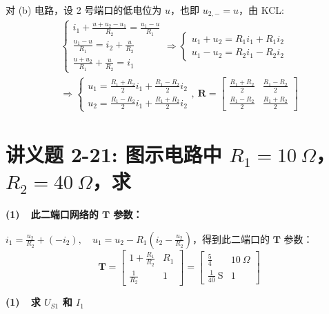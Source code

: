 \documentclass[UTF8]{report}
\theoremstyle{MyLineTheoremStyle} %
\theoremstyle{MyBlockTheoremStyle} %
\theoremstyle{MySubsubsectionStyle} %
\begin{document}
对 (b) 电路，设 2 号端口的低电位为 $u$，也即 $u_{2,-} = u$，由 KCL: 
\begin{gather}
\begin{cases}
    i_1 + \frac{u+u_2 - u_1}{R_2} = \frac{u_1 - u}{R_1} \\ 
    \frac{u_1 - u}{R_1} = i_2 + \frac{u}{R_2} \\ 
    \frac{u+u_2}{R_1} + \frac{u}{R_2} = i_1
\end{cases}
\Longrightarrow
\begin{cases}
    u_1 + u_2 = R_1i_1 + R_1i_2 \\ 
    u_1 - u_2 = R_2i_1 - R_2i_2
\end{cases} 
\\
\Longrightarrow 
\begin{cases}
    u_1 = \frac{R_1+R_2}{2}i_1 + \frac{R_1-R_2}{2}i_2 \\
    u_2 = \frac{R_1-R_2}{2}i_1 + \frac{R_1+R_2}{2}i_2
\end{cases},\ 
\boldsymbol{R} = 
\begin{bmatrix}
    \frac{R_1+R_2}{2} & \frac{R_1-R_2}{2} \\ 
    \frac{R_1-R_2}{2} & \frac{R_1+R_2}{2}
\end{bmatrix}
\end{gather}



\section{讲义题 2-21: 图示电路中 $R_1 = 10\ \Omega$，$R_2 = 40\ \Omega$，求}

\noindent \textbf{(1)\ \ 此二端口网络的 $\boldsymbol{T}$ 参数：}

$i_1 = \frac{u_2}{R_2} + (-i_2),\quad u_1 = u_2 - R_1(i_2 - \frac{u_2}{R_2})$，得到此二端口的 $\boldsymbol{T}$ 参数：
\begin{equation}
\boldsymbol{T} = 
\begin{bmatrix}
    1 + \frac{R_1}{R_2} & R_1 \\ 
    \frac{1}{R_2} & 1
\end{bmatrix}
=
\begin{bmatrix}
    \frac{5}{4} & 10\  \Omega \\ 
    \frac{1}{40} \ \mathrm{S} & 1
\end{bmatrix}
\end{equation}

\noindent \textbf{(1)\ \ 求 $U_{S1}$ 和 $I_1$}
\end{document}
